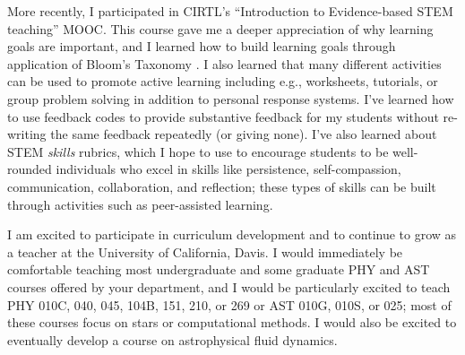 \documentclass[11pt]{article}
\begin{document}
More recently, I participated in CIRTL's ``Introduction to Evidence-based STEM teaching'' MOOC.
This course gave me a deeper appreciation of why learning goals are important, and I learned how to build learning goals through application of Bloom's Taxonomy \citep{simon_taylor_2008}.
I also learned that many different activities can be used to promote active learning including e.g., worksheets, tutorials, or group problem solving in addition to personal response systems.
I've learned how to use feedback codes to provide substantive feedback for my students without re-writing the same feedback repeatedly (or giving none).
I've also learned about STEM \emph{skills} rubrics, which I hope to use to encourage students to be well-rounded individuals who excel in skills like persistence, self-compassion, communication, collaboration, and reflection; these types of skills can be built through activities such as peer-assisted learning.


I am excited to participate in curriculum development and to continue to grow as a teacher at the University of California, Davis.
I would immediately be comfortable teaching most undergraduate and some graduate PHY and AST courses offered by your department, and I would be particularly excited to teach PHY 010C, 040, 045, 104B, 151, 210, or 269 or AST 010G, 010S, or 025; most of these courses focus on stars or computational methods.
I would also be excited to eventually develop a course on astrophysical fluid dynamics.


{\scriptsize

}
\end{document}
